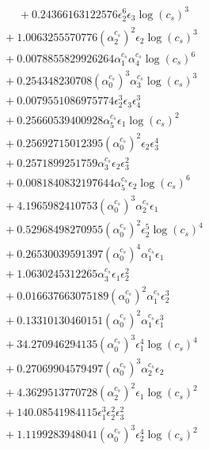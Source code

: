\documentclass[10pt]{article}
\begin{document}
\begin{align*}
\phantom{F_{s,7}} &\phantom{={}}{}  + 0.24366163122576 \epsilon_{2}^{6} \epsilon_{3} \log{\left(c_{s} \right)}^{3} \\
&{}  + 1.0063255570776 \left(\alpha_{2}^{c_s}\right)^{2} \epsilon_{2} \log{\left(c_{s} \right)}^{3} \\
&{}  + 0.0078855829926264 \alpha_{1}^{c_s} \alpha_{4}^{c_s} \log{\left(c_{s} \right)}^{6} \\
&{}  + 0.254348230708 \left(\alpha_{0}^{c_s}\right)^{3} \alpha_{3}^{c_s} \log{\left(c_{s} \right)}^{3} \\
&{}  + 0.0079551086975774 \epsilon_{2}^{3} \epsilon_{3} \epsilon_{4}^{3} \\
&{}  + 0.25660539400928 \alpha_{5}^{c_s} \epsilon_{1} \log{\left(c_{s} \right)}^{2} \\
&{}  + 0.25692715012395 \left(\alpha_{0}^{c_s}\right)^{2} \epsilon_{2} \epsilon_{3}^{4} \\
&{}  + 0.2571899251759 \alpha_{3}^{c_s} \epsilon_{2} \epsilon_{3}^{2} \\
&{}  + 0.0081840832197644 \alpha_{5}^{c_s} \epsilon_{2} \log{\left(c_{s} \right)}^{6} \\
&{}  + 4.1965982410753 \left(\alpha_{0}^{c_s}\right)^{3} \alpha_{2}^{c_s} \epsilon_{1} \\
&{}  + 0.52968498270955 \left(\alpha_{0}^{c_s}\right)^{2} \epsilon_{2}^{5} \log{\left(c_{s} \right)}^{4} \\
&{}  + 0.26530039591397 \left(\alpha_{0}^{c_s}\right)^{4} \alpha_{1}^{c_s} \epsilon_{1} \\
&{}  + 1.0630245312265 \alpha_{3}^{c_s} \epsilon_{1} \epsilon_{2}^{2} \\
&{}  + 0.016637663075189 \left(\alpha_{0}^{c_s}\right)^{2} \alpha_{1}^{c_s} \epsilon_{2}^{3} \\
&{}  + 0.13310130460151 \left(\alpha_{0}^{c_s}\right)^{2} \alpha_{1}^{c_s} \epsilon_{1}^{3} \\
&{}  + 34.270946294135 \left(\alpha_{0}^{c_s}\right)^{3} \epsilon_{1}^{4} \log{\left(c_{s} \right)}^{4} \\
&{}  + 0.27069904579497 \left(\alpha_{0}^{c_s}\right)^{3} \alpha_{2}^{c_s} \epsilon_{2} \\
&{}  + 4.3629513770728 \left(\alpha_{2}^{c_s}\right)^{2} \epsilon_{1} \log{\left(c_{s} \right)}^{2} \\
&{}  + 140.08541984115 \epsilon_{1}^{3} \epsilon_{2}^{2} \epsilon_{3}^{2} \\
&{}  + 1.1199283948041 \left(\alpha_{0}^{c_s}\right)^{3} \epsilon_{2}^{4} \log{\left(c_{s} \right)}^{2} \\

\end{align*}
\end{document}
